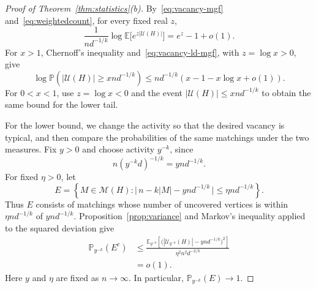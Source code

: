 \documentclass[11pt,reqno]{amsart}
\numberwithin{equation}{section}
\theoremstyle{plain}
\theoremstyle{definition}
\newcommand{\calM}{\mathcal{M}}
\newcommand{\E}{\mathbb E}
\newcommand{\Prob}{\mathbb P}
\newcommand{\calU}{\mathcal U}
\begin{document}
\begin{proof}[Proof of Theorem~\ref{thm:statistics}(b)]
    By~\eqref{eq:vacancy-mgf} and~\eqref{eq:weightedcount}, for every fixed real $z$,
    \begin{equation}\label{eq:vacancy-ld-mgf}
        \frac{1}{nd^{-1/k}}\log\E\bigl[e^{z|\calU(H)|}\bigr]=e^z-1+o(1).
    \end{equation}
    For $x>1$, Chernoff's inequality and~\eqref{eq:vacancy-ld-mgf}, with $z=\log x>0$, give
    \[
        \log\Prob(|\calU(H)|\ge xnd^{-1/k})
        \le nd^{-1/k}(x-1-x\log x+o(1)).
    \]
    For $0<x<1$, use $z=\log x<0$ and the event $|\calU(H)|\le xnd^{-1/k}$ to obtain the same bound for the lower tail.

    For the lower bound, we change the activity so that the desired vacancy is typical, and then compare the probabilities of the same matchings under the two measures.
    Fix $y>0$ and choose activity $y^{-k}$, since
    \[
        n(y^{-k}d)^{-1/k}=ynd^{-1/k}.
    \]
    For fixed $\eta>0$, let
    \[
        E=\left\{M\in\calM(H):
        \bigl|\,n-k|M|-ynd^{-1/k}\,\bigr|\le\eta nd^{-1/k}\right\}.
    \]
    Thus $E$ consists of matchings whose number of uncovered vertices is within $\eta nd^{-1/k}$ of $ynd^{-1/k}$.
    Proposition~\ref{prop:variance} and Markov's inequality applied to the squared deviation give
    \[
        \begin{aligned}
            \Prob_{y^{-k}}(E^c)
            &\le\frac{\E_{y^{-k}}\left[\bigl(|\calU_{y^{-k}}(H)|-ynd^{-1/k}\bigr)^2\right]}
            {\eta^2n^2d^{-2/k}}\\
            &=o(1).
        \end{aligned}
    \]
    Here $y$ and $\eta$ are fixed as $n\to\infty$.
    In particular, $\Prob_{y^{-k}}(E)\to1$.


\end{proof}
\end{document}
